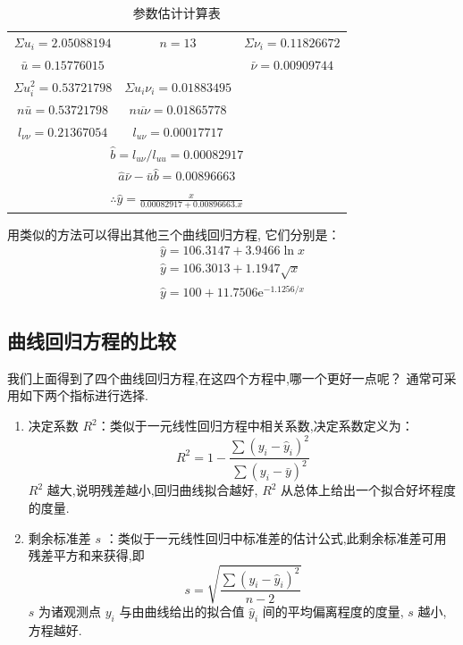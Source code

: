 \begin{table}[!htb]
  \renewcommand*{\arraystretch}{1.5}
    \centering
    \caption{参数估计计算表}
    \begin{tabular}{ccc}
      \toprule
     $\Sigma u_i=2.050 88194$   &    $n=13$     &  $\Sigma \nu_i=0.11826672$  \\
     $\bar{u}=0.157 76015$   &       &  $ \bar{\nu} =0.009 097 44$  \\
     $\Sigma u_{i}^{2}=0.537 217 98$   &    $\Sigma u_i\nu_i=0.01883495$     &  \\
     $n\bar{u}=0.537 21798$   &   $n\overline{u\nu}=0.01865778$      &  \\
     $l_{\nu\nu}=0.21367054$   &   $l_{u\nu}=0.000 17717$      &  \\
        \multicolumn{3}{c}{ $\hat{b}=l_{u\nu }/l_{uu}=0.00082917$ } \\
        \multicolumn{3}{c}{ $\hat{a}\bar{\nu}-\bar{u}\hat{b}=0.00896663$ } \\
        \multicolumn{3}{c}{ $\displaystyle\therefore \hat{y}=\frac{x}{0.00082917+0.00896663.x}$ } \\[2ex]
        \bottomrule
    \end{tabular}%
    \label{tab:8.5.3}%
\end{table}%
用类似的方法可以得出其他三个曲线回归方程, 它们分别是：
\begin{equation*}
\begin{array}{l}
{\hat{y}=106.3147+3.9466 \ln x} \\ 
{\hat{y}=106.3013+1.1947 \sqrt{x}} \\ 
{\hat{y}=100+11.7506 \mathrm{e}^{-1.1256 / x}}
\end{array}
\end{equation*}

\subsection{曲线回归方程的比较}\label{ssec:8.5.3}

我们上面得到了四个曲线回归方程,在这四个方程中,哪一个更好一点呢？
通常可采用如下两个指标进行选择.
\begin{enumerate}
    \item 决定系数 $R^2$：类似于一元线性回归方程中相关系数,决定系数定义为：
    \begin{equation}
    R^{2}=1-\frac{\sum\left(y_{i}-\hat{y}_{i}\right)^{2}}{\sum\left(y_{i}-\bar{y}\right)^{2}}\label{eq:8.5.5}
    \end{equation} $R^2$ 越大,说明残差越小,回归曲线拟合越好, $R^2$ 从总体上给出一个拟合好坏程度的度量.
    \item 剩余标准差 $s$ ：类似于一元线性回归中标准差的估计公式,此剩余标准差可用残差平方和来获得,即
    \begin{equation}
    s=\sqrt{\frac{\sum (y_i-\hat{y}_i)^2}{n-2}}\label{eq:8.5.6}
    \end{equation}
 $s$ 为诸观测点 $y_i$ 与由曲线给出的拟合值 $\hat{y}_i$ 间的平均偏离程度的度量, $s$ 越小,方程越好.
\end{enumerate}

